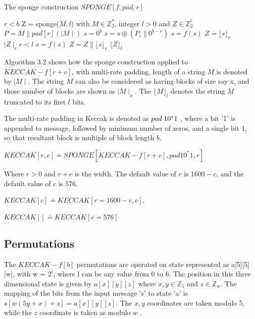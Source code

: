   \begin{algorithm}
    \caption{The sponge construction $SPONGE[f, pad, r]$ \cite{00016}}
    \begin{algorithmic}[1]
      \Require $r < b$
       Z = sponge($M, l$) with $M \in \mathbb{Z}^{*}_{2}$, integer $ l > 0$ and $Z \in \mathbb{Z}^{l}_{2}$
      \State $P = M \parallel pad[r](\mid M \mid)$
      \State $s = 0^{b}$
      \State {}
        \State $s = s \oplus ( P_{i} \parallel 0^{b - r})$
        \State $s = f(s)$
      \State \EndFor
      \State $ Z = \lfloor s \rfloor_{r}$
      \State \While $\mid Z \mid_{r} r < l $
        \State $s = f(s)$
        \State $Z = Z \parallel \lfloor s \rfloor_{r}$
      \State \EndWhile
      \State \Return $\lfloor Z \rfloor_{l}$ 
    \end{algorithmic}
  \end{algorithm}

  Algorithm 3.2 shows how the sponge construction applied to $KECCAK-f[r + c]$, with multi-rate padding, length of a 
  string $M$ is denoted by $\mid M \mid $. The string $M$ can also be considered as having blocks of size say x,
  and those number of blocks are shown as $\mid M \mid_{x}$. The $\lfloor M \rfloor_{l}$ denotes the string
  $M$ truncated to its first $l$ bits.
  
  The multi-rate padding in Keccak is denoted as $pad \thickspace 1 0^{*}1$ , where a bit '1' is appended to message, 
  followed by minimum number of zeros, and a single bit 1, so that resultant block is multiple of block length $b$.
  \begin{center}$KECCAK[r, c] \doteq SPONGE[KECCAK-f[r + c], pad1 0^{*}1, r]$ \end{center}
  Where $ r > 0$ and $r + c$ is the width. The default value of $r$ is $1600 - c$, and the default value of $c$ is 576.
  \begin{center}$KECCAK[c] \doteq KECCAK[r = 1600 - c, c],$\end{center}
  \begin{center}$KECCAK[] \doteq KECCAK[c = 576]$\end{center}
    
  \subsection{Permutations}

  The $KECCAK-f[b]$ permutations are operated on state represented as a[5][5][w], with w = $2^{l}$, where l can be any value
  from 0 to 6. The position in this three dimensional state is given by $a[x][y][z]$ where $x, y \in \mathbb{Z}_{5}$ and $z \in 
  \mathbb{Z}_{w}$. The mapping of the bits from the input message 's' to state 'a' is $s[w (5y + x) + z] = a[x][y][z]$.
  The $x, y$ coordinates are taken modulo 5, while the $z$ coordinate is taken as modulo $w$ \cite{00015}.

